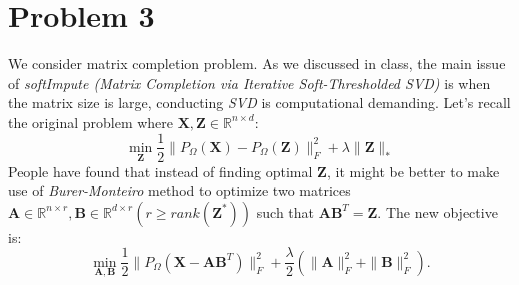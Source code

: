 \documentclass[11pt]{article}
\newcommand{\mtx}[1]{\mathbf{#1}}
\def \mA {\mtx{A}}
\def \mB {\mtx{B}}
\def \mX {\mtx{X}}
\def \mZ {\mtx{Z}}
\begin{document}
	\section*{Problem 3}
	We consider matrix completion problem. As we discussed in class, the main issue of \textit{softImpute (Matrix Completion via Iterative Soft-Thresholded SVD)} is when the matrix size is large, conducting \textit{SVD} is computational demanding. Let's recall the original problem where $\mX, \mZ \in\mathbb{R}^{n\times d}$: 
	\begin{equation}\label{eq:nuc}
	\min\limits_{\mZ}\frac{1}{2}\|P_\Omega(\mX)-P_\Omega(\mZ)\|_F^2+\lambda \|\mZ\|_*
	\end{equation} 
People have found that instead of finding optimal $\mZ$, it might be better to make use of \textit{Burer-Monteiro} method to optimize two matrices $\mA \in\mathbb{R}^{n\times r}, \mB\in\mathbb{R}^{d\times r} (r\ge rank(\mZ^*))$ such that $\mA\mB^T=\mZ$. The new objective is:
	\begin{equation}\label{eq:bur}
	\min\limits_{\mA,\mB}\frac{1}{2}\|P_\Omega(\mX-\mA\mB^T)\|_F^2+\frac{\lambda}{2}(\|\mA\|_F^2+\|\mB\|^2_F).
\end{equation} 
\end{document}
